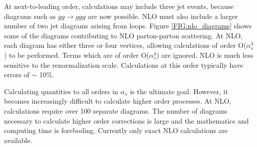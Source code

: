 At next-to-leading order, calculations may include three 
jet events, because diagrams such as $gg \rightarrow ggg$ are now possible. 
NLO must also include a larger number of two jet diagrams arising from loops.
Figure \ref{FIG:nlo_diagrams} shows some of the diagrams contributing to
NLO parton-parton scattering.
At NLO, each diagram has either three or four vertices, allowing
calculations of order O($\alpha^{3}_{s}$) to be performed. 
Terms which are of order O($\alpha^{4}_{s}$) are ignored.
NLO is much less sensitive to the renormalization scale. Calculations at this
order typically have errors of $\sim$ 10\%. 
 
Calculating quantities to all orders in $\alpha_{s}$
is the ultimate goal. However, it becomes increasingly
difficult to calculate higher order processes. 
At NLO, calculations require over 100 separate diagrams.
The number of diagrams necessary
to calculate higher order corrections is large and the mathematics and computing
time is foreboding. Currently only exact NLO calculations are available.



